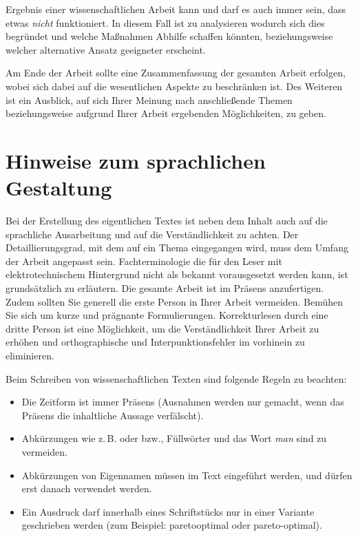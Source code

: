 Ergebnis einer wissenschaftlichen Arbeit kann und darf es auch immer sein, dass etwas \emph{nicht} funktioniert. In diesem Fall ist zu analysieren wodurch sich dies begründet und welche Maßnahmen Abhilfe schaffen könnten, beziehungsweise welcher alternative Ansatz geeigneter erscheint.

Am Ende der Arbeit sollte eine Zusammenfassung der gesamten Arbeit
erfolgen, wobei sich dabei auf die wesentlichen Aspekte zu
beschränken ist. Des Weiteren ist ein Ausblick, auf sich Ihrer
Meinung nach anschließende Themen beziehungsweise aufgrund Ihrer
Arbeit ergebenden Möglichkeiten, zu geben.



\section{Hinweise zum sprachlichen Gestaltung}
\label{hinweise:sprache}

Bei der Erstellung des eigentlichen Textes ist neben dem Inhalt
auch auf die sprachliche Ausarbeitung und auf die Verständlichkeit
zu achten. Der Detaillierungsgrad, mit dem auf ein Thema
eingegangen wird, muss dem Umfang der Arbeit angepasst sein.
Fachterminologie die für den Leser mit elektrotechnischem
Hintergrund nicht als bekannt vorausgesetzt werden kann, ist
grundsätzlich zu erläutern. Die gesamte Arbeit ist im Präsens
anzufertigen. Zudem sollten Sie generell die erste Person in Ihrer
Arbeit vermeiden. Bemühen Sie sich um kurze und prägnante
Formulierungen. Korrekturlesen durch eine dritte Person ist eine
Möglichkeit, um die Verständlichkeit Ihrer Arbeit zu erhöhen und
orthographische und Interpunktionsfehler im vorhinein zu
eliminieren.

Beim Schreiben von wissenschaftlichen Texten sind folgende Regeln zu beachten:

\begin{itemize}
  \item Die Zeitform ist immer Präsens (Ausnahmen werden nur gemacht, wenn das Präsens die inhaltliche Aussage verfälscht).
  \item Abkürzungen wie z.\,B. oder bzw., Füllwörter und das Wort \textit{man} sind zu vermeiden.
  \item Abkürzungen von Eigennamen müssen im Text eingeführt werden, und dürfen erst danach verwendet werden.
  \item Ein Ausdruck darf innerhalb eines Schriftstücks nur in einer Variante geschrieben werden (zum Beispiel: paretooptimal oder pareto-optimal).
\end{itemize}


